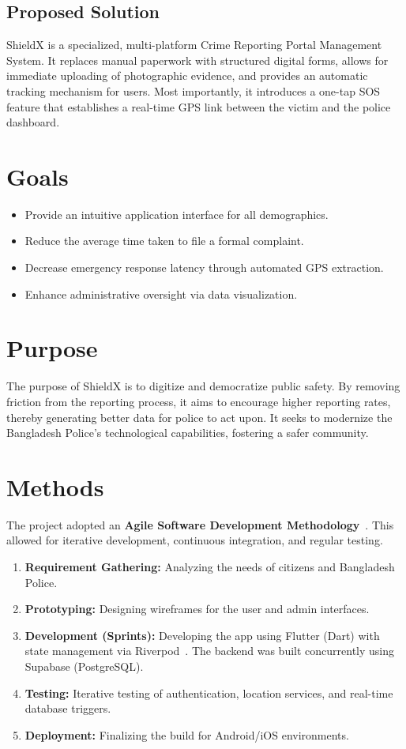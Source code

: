 \documentclass[12pt, a4paper, twoside, openany]{report}
\begin{document}
\subsection{Proposed Solution}
ShieldX is a specialized, multi-platform Crime Reporting Portal Management System. It replaces manual paperwork with structured digital forms, allows for immediate uploading of photographic evidence, and provides an automatic tracking mechanism for users. Most importantly, it introduces a one-tap SOS feature that establishes a real-time GPS link between the victim and the police dashboard.

\section{Goals}
\begin{itemize}
    \item Provide an intuitive application interface for all demographics.
    \item Reduce the average time taken to file a formal complaint.
    \item Decrease emergency response latency through automated GPS extraction.
    \item Enhance administrative oversight via data visualization.
\end{itemize}

\section{Purpose}
The purpose of ShieldX is to digitize and democratize public safety. By removing friction from the reporting process, it aims to encourage higher reporting rates, thereby generating better data for police to act upon. It seeks to modernize the Bangladesh Police's technological capabilities, fostering a safer community.

\section{Methods}
The project adopted an \textbf{Agile Software Development Methodology}~\cite{agile}. This allowed for iterative development, continuous integration, and regular testing.
\begin{enumerate}
    \item[] \textbf{Requirement Gathering:} Analyzing the needs of citizens and Bangladesh Police.
    \item[] \textbf{Prototyping:} Designing wireframes for the user and admin interfaces.
    \item[] \textbf{Development (Sprints):} Developing the app using Flutter (Dart) with state management via Riverpod~\cite{riverpod}. The backend was built concurrently using Supabase (PostgreSQL).
    \item[] \textbf{Testing:} Iterative testing of authentication, location services, and real-time database triggers.
    \item[] \textbf{Deployment:} Finalizing the build for Android/iOS environments.
\end{enumerate}
\end{document}
